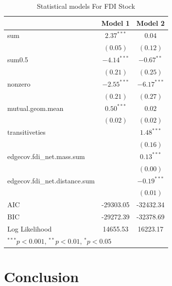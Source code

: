 \documentclass{article}
\begin{document}
\begin{table}[!htbp] 
\begin{center}
\begin{tabular}{l c c }
\hline
 & Model 1 & Model 2 \\
\hline
sum                           & $2.37^{***}$  & $0.04$        \\
                              & $(0.05)$      & $(0.12)$      \\
sum0.5                        & $-4.14^{***}$ & $-0.67^{**}$  \\
                              & $(0.21)$      & $(0.25)$      \\
nonzero                       & $-2.55^{***}$ & $-6.17^{***}$ \\
                              & $(0.21)$      & $(0.27)$      \\
mutual.geom.mean              & $0.50^{***}$  & $0.02$        \\
                              & $(0.02)$      & $(0.02)$      \\
transitiveties                &               & $1.48^{***}$  \\
                              &               & $(0.16)$      \\
edgecov.fdi\_net.mass.sum     &               & $0.13^{***}$  \\
                              &               & $(0.00)$      \\
edgecov.fdi\_net.distance.sum &               & $-0.19^{***}$ \\
                              &               & $(0.01)$      \\
\hline
AIC                           & -29303.05     & -32432.34     \\
BIC                           & -29272.39     & -32378.69     \\
Log Likelihood                & 14655.53      & 16223.17      \\
\hline
\multicolumn{3}{l}{\scriptsize{$^{***}p<0.001$, $^{**}p<0.01$, $^*p<0.05$}}
\end{tabular}
\caption{Statistical models For FDI Stock}
\label{table:coefficients}
\end{center}
\end{table}






\section{Conclusion}


\newpage


\end{document}
